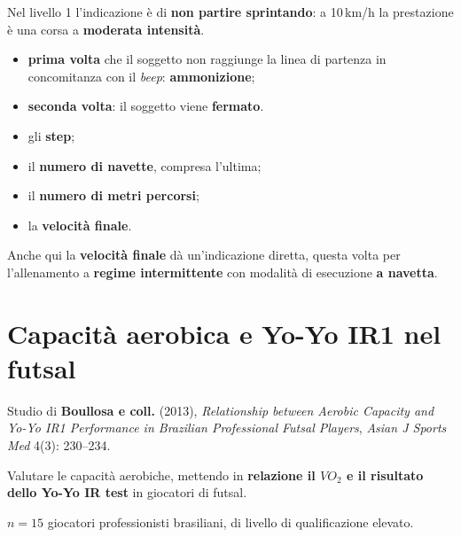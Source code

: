 Nel livello 1 l'indicazione è di \textbf{non partire sprintando}: a 10\,km/h la prestazione è una
corsa a \textbf{moderata intensità}.

\begin{itemize}
  \item \textbf{prima volta} che il soggetto non raggiunge la linea di partenza in concomitanza con
    il \textit{beep}: \textbf{ammonizione};
  \item \textbf{seconda volta}: il soggetto viene \textbf{fermato}.
\end{itemize}

\begin{itemize}
  \item gli \textbf{step};
  \item il \textbf{numero di navette}, compresa l'ultima;
  \item il \textbf{numero di metri percorsi};
  \item la \textbf{velocità finale}.
\end{itemize}

Anche qui la \textbf{velocità finale} dà un'indicazione diretta, questa volta per l'allenamento a
\textbf{regime intermittente} con modalità di esecuzione \textbf{a navetta}.

\section{Capacità aerobica e Yo-Yo IR1 nel futsal}

Studio di \textbf{Boullosa e coll.} (2013), \textit{Relationship between Aerobic Capacity and
Yo-Yo IR1 Performance in Brazilian Professional Futsal Players}, \textit{Asian J Sports Med}
4(3): 230--234.

Valutare le capacità aerobiche, mettendo in \textbf{relazione il $VO_2$ e il risultato dello Yo-Yo
IR test} in giocatori di futsal.

$n = 15$ giocatori professionisti brasiliani, di livello di qualificazione elevato.

